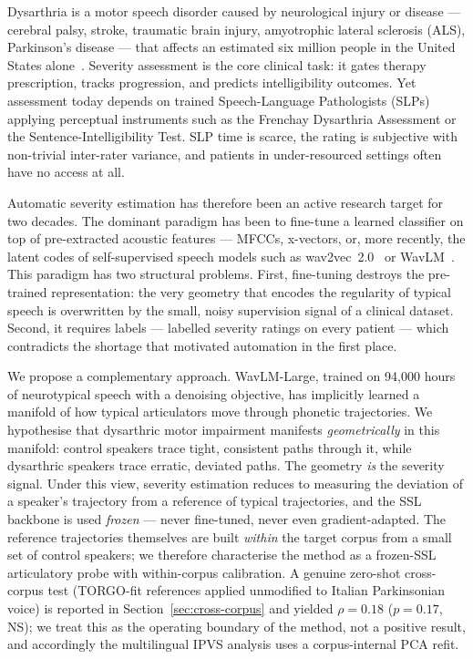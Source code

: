 
Dysarthria is a motor speech disorder caused by neurological injury or
disease --- cerebral palsy, stroke, traumatic brain injury, amyotrophic
lateral sclerosis (ALS), Parkinson's disease --- that affects an estimated
six million people in the United States alone~\cite{Enderby1980Frenchay}.
Severity assessment is the core clinical task: it gates therapy
prescription, tracks progression, and predicts intelligibility outcomes.
Yet assessment today depends on trained Speech-Language Pathologists (SLPs)
applying perceptual instruments such as the Frenchay Dysarthria Assessment
or the Sentence-Intelligibility Test. SLP time is scarce, the rating is
subjective with non-trivial inter-rater variance, and patients in
under-resourced settings often have no access at all.

Automatic severity estimation has therefore been an active research target
for two decades. The dominant paradigm has been to fine-tune a learned
classifier on top of pre-extracted acoustic features --- MFCCs, x-vectors,
or, more recently, the latent codes of self-supervised speech models such
as wav2vec~2.0~\cite{Baevski2020wav2vec2} or
WavLM~\cite{Chen2022WavLM,Hernandez2020SSLDysarthria,Joshi2021IndianDysarthria}.
This paradigm has two structural problems. First, fine-tuning destroys the
pre-trained representation: the very geometry that encodes the regularity
of typical speech is overwritten by the small, noisy supervision signal of
a clinical dataset. Second, it requires labels --- labelled severity ratings
on every patient --- which contradicts the shortage that motivated automation
in the first place.

We propose a complementary approach. WavLM-Large, trained on 94{,}000
hours of neurotypical speech with a denoising objective, has implicitly
learned a manifold of how typical articulators move through phonetic
trajectories. We hypothesise that dysarthric motor impairment manifests
\emph{geometrically} in this manifold: control speakers trace tight,
consistent paths through it, while dysarthric speakers trace erratic,
deviated paths. The geometry \emph{is} the severity signal. Under this
view, severity estimation reduces to measuring the deviation of a
speaker's trajectory from a reference of typical trajectories, and the
SSL backbone is used \emph{frozen} --- never fine-tuned, never even
gradient-adapted. The reference trajectories themselves are built
\emph{within} the target corpus from a small set of control speakers; we
therefore characterise the method as a frozen-SSL articulatory probe
with within-corpus calibration. A genuine zero-shot cross-corpus test
(TORGO-fit references applied unmodified to Italian Parkinsonian voice)
is reported in Section~\ref{sec:cross-corpus} and yielded
$\rho = 0.18$ ($p = 0.17$, NS); we treat this as the operating
boundary of the method, not a positive result, and accordingly the
multilingual IPVS analysis uses a corpus-internal PCA refit.

